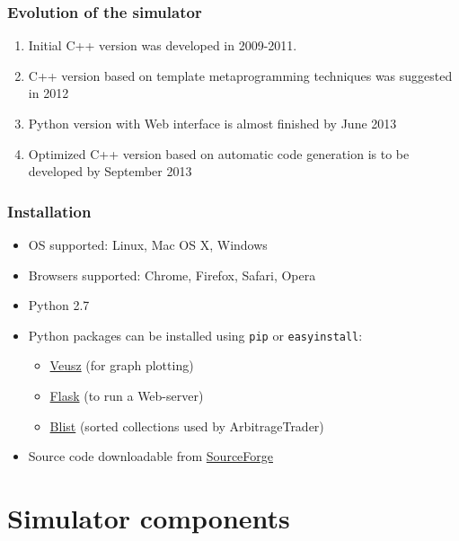 \documentclass{beamer}
\begin{document}
\begin{frame}
\frametitle{Evolution of the simulator}
\begin{enumerate}
  \item Initial C++ version was developed in 2009-2011.  
  \item C++ version based on template metaprogramming techniques was suggested in 2012
  \item Python version with Web interface is almost finished by June 2013
  \item Optimized C++ version based on automatic code generation is to be developed by September 2013
\end{enumerate}
\end{frame}
\begin{frame}
\frametitle{Installation}
\begin{itemize}
\item OS supported: Linux, Mac OS X, Windows
\item Browsers supported: Chrome, Firefox, Safari, Opera
\item Python 2.7
\item Python packages can be installed using \texttt{pip} or \texttt{easyinstall}:
\begin{itemize}
\item \textcolor[rgb]{0.00,0.50,0.75}{\href{http://home.gna.org/veusz/}{Veusz}} (for graph plotting)
\item \textcolor[rgb]{0.00,0.50,0.75}{\href{http://flask.pocoo.org}{Flask}} (to run a Web-server)
\item \textcolor[rgb]{0.00,0.50,0.75}{\href{https://pypi.python.org/pypi/blist/}{Blist}} (sorted collections used by ArbitrageTrader) 
\end{itemize}
\item Source code downloadable from \textcolor[rgb]{0.00,0.50,0.75}{\href{http://sourceforge.net/p/marketsimulator/svn/HEAD/tree/DevAnton/v3/}{SourceForge}}
\end{itemize}

\end{frame}

\section{Simulator components}
\end{document}
